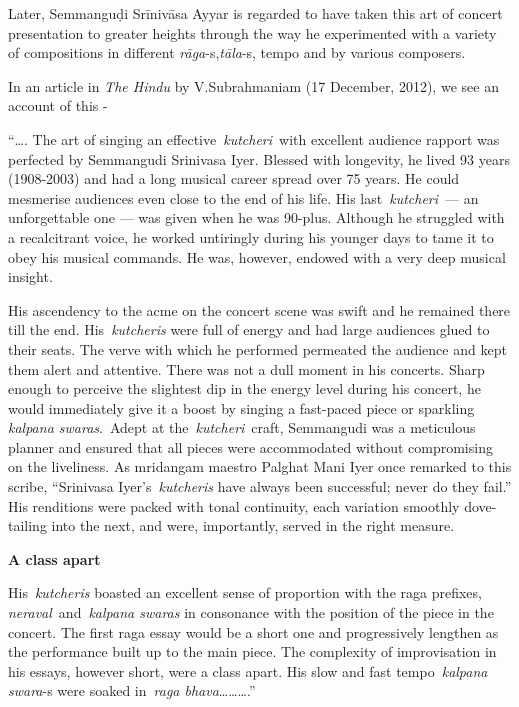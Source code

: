 Later, Semmanguḍi Srīnivāsa Ayyar is regarded to have taken this art of concert presentation to greater heights through the way he experimented with a variety of compositions in different \textit{rāga}-s,\break \textit{tāla}-s, tempo and by various composers.

In an article in \textit{The Hindu} by V.Subrahmaniam (17 December, 2012), we see an account of this -

\begin{myquote}
“…. The art of singing an effective \textit{kutcheri} with excellent audience rapport was perfected by Semmangudi Srinivasa Iyer. Blessed with longevity, he lived 93 years (1908-2003) and had a long musical career spread over 75 years. He could mesmerise audiences even close to the end of his life. His last \textit{kutcheri} — an unforgettable one — was given when he was 90-plus. Although he struggled with a recalcitrant voice, he worked untiringly during his younger days to tame it to obey his musical commands. He was, however, endowed with a very deep musical insight.
\end{myquote}

\begin{myquote}
His ascendency to the acme on the concert scene was swift and he remained there till the end. His \textit{kutcheris} were full of energy and had large audiences glued to their seats. The verve with which he performed permeated the audience and kept them alert and attentive. There was not a dull moment in his concerts. Sharp enough to perceive the slightest dip in the energy level during his concert, he would immediately give it a boost by singing a fast-paced piece or sparkling \textit{kalpana swaras}. Adept at the \textit{kutcheri} craft, Semmangudi was a meticulous planner and ensured that all pieces were accommodated without compromising on the liveliness. As mridangam maestro Palghat Mani Iyer once remarked to this scribe, “Srinivasa Iyer’s \textit{kutcheris} have always been successful; never do they fail.” His renditions were packed with tonal continuity, each variation smoothly dove-tailing into the next, and were, importantly, served in the right measure.
\end{myquote}

\textbf{A class apart}

\begin{myquote}
His \textit{kutcheris} boasted an excellent sense of proportion with the raga prefixes, \textit{neraval} and \textit{kalpana swaras} in consonance with the position of the piece in the concert. The first raga essay would be a short one and progressively lengthen as the performance built up to the main piece. The complexity of improvisation in his essays, however short, were a class apart. His slow and fast tempo \textit{kalpana swara}-s were soaked in \textit{raga bhava}……….”
\end{myquote}



